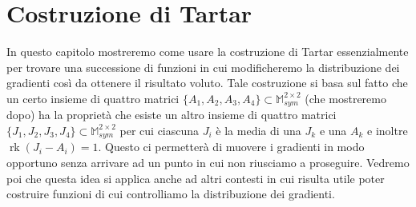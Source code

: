 \documentclass[a4paper,11pt]{book}
\theoremstyle{plain}
\theoremstyle{definition}
\theoremstyle{remark}
\newcommand{\M}{\mathbb{M}}
\DeclareMathOperator{\Id}{Id}
\DeclareMathOperator{\rk}{rk}
\begin{document}
\begin{comment}
		Deve dunque accadere, a meno di scambiare $A$ e $B$, che $A-MAM^{-1} = 0$, ma allora ci ritroveremmo nelle ipotesi del teorema \ref{teo:1}, e allora dovrebbe accadere che $\rk(B-MBM^{-1}) = 1$ o $B-MBM^{-1} = 0$\footnote{Questo perché si devono utilizzare sempre tutte e quattro le matrici, altrimenti mi ritroverei in un caso più semplice.}, il primo caso non può accadere quindi avrei che anche $B-MBM^{-1} = 0$. Questo porta alla conclusione che sia $A$ che $B$ commutano con $M$, ma dai conti fatti prima si deduce che
		\[
			A=\begin{pmatrix}
				a & b\\
				b & a
				\end{pmatrix}\qquad B=\begin{pmatrix}
									\alpha & \beta\\
									\beta & \alpha
									\end{pmatrix}
		\]
		Queste sono simmetriche, dunque diagonalizzabili, e commutano tra loro\footnote{Entrambe sono della forma $a\Id+bJ$ con $J=\begin{pmatrix}
									0 & 1\\
									1 & 0
									\end{pmatrix}$, dunque commutano.}, quindi sono simultaneamente diagonalizzabili.
		A meno di coniugio posso supporre che
		\[
			A=\begin{pmatrix}
				a & 0\\
				0 & b
				\end{pmatrix}\quad B=\begin{pmatrix}
									c & 0\\
									0 & d
									\end{pmatrix}\qquad \text{con }a,b,c,d\neq 0,1,\ c\neq a,\ d\neq b
		\]
		Ora si conclude in modo molto simile al secondo caso del teorema \ref{teo:2}.
\end{proof}
\end{comment}

\chapter{Costruzione di Tartar}
In questo capitolo mostreremo come usare la costruzione di Tartar essenzialmente per trovare una successione di funzioni in cui modificheremo la distribuzione dei gradienti così da ottenere il risultato voluto. Tale costruzione si basa sul fatto che un certo insieme di quattro matrici $\{A_{1},A_{2},A_{3},A_{4}\}\subset\M^{2\times 2}_{sym}$ (che mostreremo dopo) ha la proprietà che esiste un altro insieme di quattro matrici $\{J_{1},J_{2},J_{3},J_{4}\}\subset\M^{2\times 2}_{sym}$ per cui ciascuna $J_{i}$ è la media di una $J_{k}$ e una $A_{k}$ e inoltre $\rk(J_{i}-A_{i})=1$. Questo ci permetterà di muovere i gradienti in modo opportuno senza arrivare ad un punto in cui non riusciamo a proseguire. Vedremo poi che questa idea si applica anche ad altri contesti in cui risulta utile poter costruire funzioni di cui controlliamo la distribuzione dei gradienti.
\end{document}
